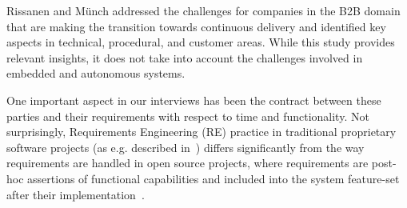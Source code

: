 Rissanen and M\"unch \cite{Rissanen2015} addressed the challenges for companies in the B2B domain that are making the transition towards continuous delivery and identified key aspects in technical, procedural, and customer areas. While this study provides relevant insights, it does not take into account the challenges involved in embedded and autonomous systems. %


One important aspect in our interviews has been the contract between these parties and their requirements with respect to time and functionality. 
Not surprisingly, Requirements Engineering (RE) practice in traditional proprietary software projects (as e.g. described in~\cite{Robertson1999,Ruhe2010}) differs significantly from the way requirements are handled in open source projects, where requirements are post-hoc assertions of functional capabilities and included into the system feature-set after their implementation~\cite{Scacchi2009}.
